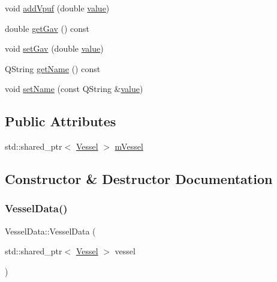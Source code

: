 \begin{DoxyCompactItemize}
void \mbox{\hyperlink{class_vessel_data_ab0454bc8acf9d691961a33b39ec2c988}{add\+Vpuf}} (double \mbox{\hyperlink{diffusion_8cpp_a4b41795815d9f3d03abfc739e666d5da}{value}})
\item 
double \mbox{\hyperlink{class_vessel_data_a85d4e6ac3633ade768fc00d6497cee82}{get\+Gav}} () const
\item 
void \mbox{\hyperlink{class_vessel_data_a7accbc88145201e34212cd633e5d38b8}{set\+Gav}} (double \mbox{\hyperlink{diffusion_8cpp_a4b41795815d9f3d03abfc739e666d5da}{value}})
\item 
Q\+String \mbox{\hyperlink{class_vessel_data_a9051ea580e3592826d4ad473ed14c3d9}{get\+Name}} () const
\item 
void \mbox{\hyperlink{class_vessel_data_ab7d2330f2149fa478b59a7828df89533}{set\+Name}} (const Q\+String \&\mbox{\hyperlink{diffusion_8cpp_a4b41795815d9f3d03abfc739e666d5da}{value}})
\end{DoxyCompactItemize}
\subsection*{Public Attributes}
\begin{DoxyCompactItemize}
\item 
std\+::shared\+\_\+ptr$<$ \mbox{\hyperlink{class_vessel}{Vessel}} $>$ \mbox{\hyperlink{class_vessel_data_acdd044b759445a4d081ac71646e673be}{m\+Vessel}}
\end{DoxyCompactItemize}


\subsection{Constructor \& Destructor Documentation}
\mbox{\label{class_vessel_data_ac3ac114dde67f0763a7c3030762ce879}} 
\subsubsection{\texorpdfstring{VesselData()}{VesselData()}}
{\footnotesize\ttfamily Vessel\+Data\+::\+Vessel\+Data (\begin{DoxyParamCaption}\item[{std\+::shared\+\_\+ptr$<$ \mbox{\hyperlink{class_vessel}{Vessel}} $>$}]{vessel }\end{DoxyParamCaption})}



